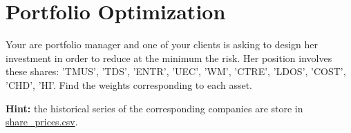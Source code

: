 \chapter{Portfolio Optimization}
\label{ex-portfolio}

\begin{question}
Your are portfolio manager and one of your clients is asking to design her investment in order to reduce at the minimum the risk. Her position involves these shares: 'TMUS', 'TDS', 'ENTR', 'UEC', 'WM', 'CTRE', 'LDOS', 'COST', 'CHD', 'HI'.
Find the weights corresponding to each asset.

\noindent\textbf{Hint:} the historical series of the corresponding companies are store in \href{https://drive.google.com/file/d/1ARryI7zpNVqlpzPsrNS2rTH9Knj07JBV/view?usp=sharing}{share\_prices.csv}.

\end{question}

